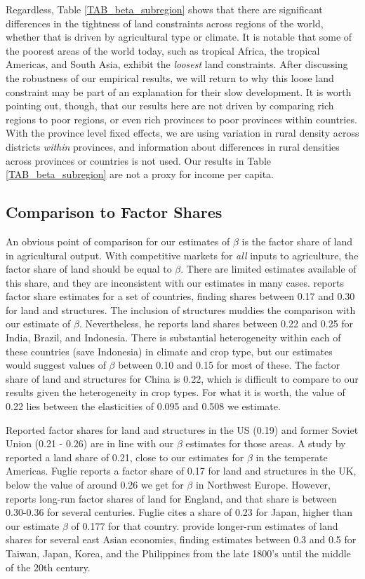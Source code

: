 \documentclass[11pt]{article}
\begin{document}
Regardless, Table \ref{TAB_beta_subregion} shows that there are significant differences in the tightness of land constraints across regions of the world, whether that is driven by agricultural type or climate. It is notable that some of the poorest areas of the world today, such as tropical Africa, the tropical Americas, and South Asia, exhibit the \textit{loosest} land constraints. After discussing the robustness of our empirical results, we will return to why this loose land constraint may be part of an explanation for their slow development. It is worth pointing out, though, that our results here are not driven by comparing rich regions to poor regions, or even rich provinces to poor provinces within countries. With the province level fixed effects, we are using variation in rural density across districts \textit{within} provinces, and information about differences in rural densities across provinces or countries is not used. Our results in Table \ref{TAB_beta_subregion} are not a proxy for income per capita. 

\subsection{Comparison to Factor Shares}
An obvious point of comparison for our estimates of $\beta$ is the factor share of land in agricultural output. With competitive markets for \textit{all} inputs to agriculture, the factor share of land should be equal to $\beta$. There are limited estimates available of this share, and they are inconsistent with our estimates in many cases. \citet{fuglie2010} reports factor share estimates for a set of countries, finding shares between 0.17 and 0.30 for land and structures. The inclusion of structures muddies the comparison with our estimate of $\beta$. Nevertheless, he reports land shares between 0.22 and 0.25 for India, Brazil, and Indonesia. There is substantial heterogeneity within each of these countries (save Indonesia) in climate and crop type, but our estimates would suggest values of $\beta$ between 0.10 and 0.15 for most of these. The factor share of land and structures for China is 0.22, which is difficult to compare to our results given the heterogeneity in crop types. For what it is worth, the value of 0.22 lies between the elasticities of 0.095 and 0.508 we estimate.

Reported factor shares for land and structures in the US (0.19) and former Soviet Union (0.21 - 0.26) are in line with our $\beta$ estimates for those areas. A study by \citet{jg1992} reported a land share of 0.21, close to our estimates for $\beta$ in the temperate Americas. Fuglie reports a factor share of 0.17 for land and structures in the UK, below the value of around 0.26 we get for $\beta$ in Northwest Europe. However, \citet{Clark2002} reports long-run factor shares of land for England, and that share is between 0.30-0.36 for several centuries. Fuglie cites a share of 0.23 for Japan, higher than our estimate $\beta$ of 0.177 for that country. \citet{hrs1979} provide longer-run estimates of land shares for several east Asian economies, finding estimates between 0.3 and 0.5 for Taiwan, Japan, Korea, and the Philippines from the late 1800's until the middle of the 20th century.
\end{document}
